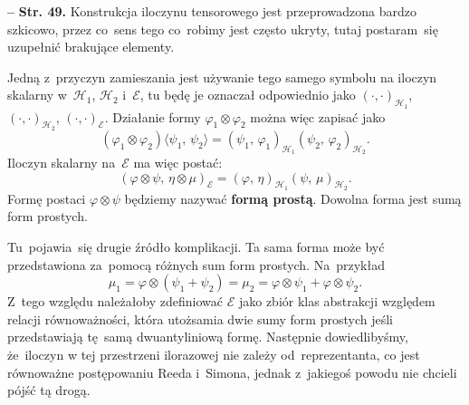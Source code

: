 \documentclass[a4paper,11pt]{article}
\newcommand{\spaceFour}{0.5em}
\newcommand{\mc}{\mathcal}
\newcommand{\al}{\alpha}
\newcommand{\vp}{\varphi}
\newcommand{\Hc}{\mc{H}}
\newcommand{\ot}{\otimes}
\newcommand{\lket}{\langle}
\newcommand{\rket}{\rangle}
\newcommand{\tb}{\textbf}
\newcommand{\noi}{\noindent}
\newcommand{\start}{\noi \tb{--} {}}
\newcommand{\Str}[1]{\tb{Str. #1.}}
\newcommand{\SP}[2]{( #1, \, #2 )} %
\newcommand{\dket}[2]{\lket #1, \, #2 \rket} %
\begin{document}
\vspace{\spaceFour}


\start \Str{49} Konstrukcja iloczynu tensorowego jest przeprowadzona
bardzo szkicowo, przez co~sens tego co~robimy jest często ukryty,
tutaj postaram~się uzupełnić brakujące elementy.


Jedną z~przyczyn zamieszania jest używanie tego samego symbolu na
iloczyn skalarny w~$\Hc_{ 1 }$, $\Hc_{ 2 }$ i~$\mc{E}$, tu będę je
oznaczał odpowiednio jako $( \cdot, \cdot )_{ \Hc_{ 1 } }$,
$( \cdot, \cdot )_{ \Hc_{ 2 } }$, $( \cdot, \cdot )_{ \mc{ E } }$.
Działanie formy $\vp_{ 1 } \ot \vp_{ 2 }$ można więc zapisać jako
\begin{equation*}
  ( \vp_{ 1 } \ot \vp_{ 2 } )\dket{ \psi_{ 1 }}{ \psi_{ 2 } }
  = \SP{ \psi_{ 1 } }{ \vp_{ 1 } }_{ \Hc_{ 1 } } \SP{ \psi_{ 2 } }
  { \vp_{ 2 } }_{ \Hc_{ 2 } }.
\end{equation*}
Iloczyn skalarny na~$\mc{E}$ ma więc postać:
\begin{equation*}
  \SP{ \vp \ot \psi }{ \eta \ot \mu }_{ \mc{E} }
  = \SP{ \vp }{ \eta }_{ \Hc_{ 1 } } \SP{ \psi }{ \mu }_{ \Hc_{ 2 } }.
\end{equation*}
Formę postaci $\vp \ot \psi$ będziemy nazywać \tb{formą prostą}.
Dowolna forma jest sumą form prostych.

Tu~pojawia~się drugie źródło komplikacji. Ta sama forma może być
przedstawiona za~pomocą różnych sum form prostych. Na~przykład
\begin{equation*}
  \mu_{ 1 } = \vp \ot ( \psi_{ 1 } + \psi_{ 2 } ) = \mu_{ 2 }
  = \vp \ot \psi_{ 1 } + \vp \ot \psi_{ 2 }.
\end{equation*}
Z~tego względu należałoby zdefiniować $\mc{E}$ jako zbiór klas
abstrakcji względem relacji równoważności, która utożsamia dwie sumy
form prostych jeśli przedstawiają tę~samą dwuantyliniową formę.
Następnie dowiedlibyśmy, że~iloczyn w tej przestrzeni ilorazowej nie
zależy od~reprezentanta, co jest równoważne postępowaniu Reeda
i~Simona, jednak z~jakiegoś powodu nie chcieli pójść tą drogą.
\end{document}
